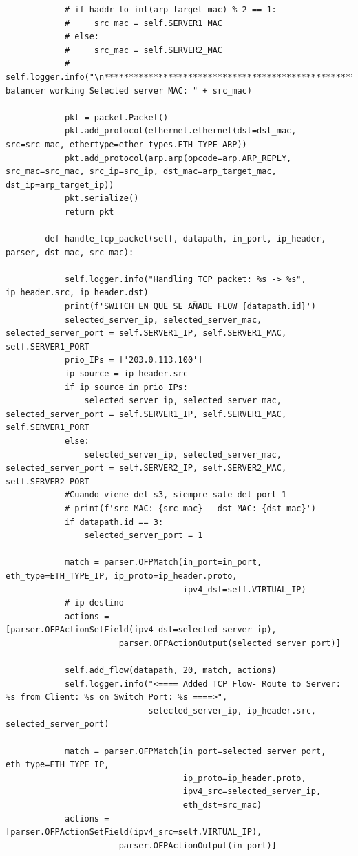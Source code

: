\documentclass[a4paper,12pt]{article}
\begin{document}
\begin{verbatim}
            # if haddr_to_int(arp_target_mac) % 2 == 1:
            #     src_mac = self.SERVER1_MAC
            # else:
            #     src_mac = self.SERVER2_MAC
            # self.logger.info("\n************************************************************\nLoad balancer working Selected server MAC: " + src_mac)
    
            pkt = packet.Packet()
            pkt.add_protocol(ethernet.ethernet(dst=dst_mac, src=src_mac, ethertype=ether_types.ETH_TYPE_ARP))
            pkt.add_protocol(arp.arp(opcode=arp.ARP_REPLY, src_mac=src_mac, src_ip=src_ip, dst_mac=arp_target_mac, dst_ip=arp_target_ip))
            pkt.serialize()
            return pkt
    
        def handle_tcp_packet(self, datapath, in_port, ip_header, parser, dst_mac, src_mac):
    
            self.logger.info("Handling TCP packet: %s -> %s", ip_header.src, ip_header.dst)
            print(f'SWITCH EN QUE SE AÑADE FLOW {datapath.id}')
            selected_server_ip, selected_server_mac, selected_server_port = self.SERVER1_IP, self.SERVER1_MAC, self.SERVER1_PORT
            prio_IPs = ['203.0.113.100']
            ip_source = ip_header.src
            if ip_source in prio_IPs:
                selected_server_ip, selected_server_mac, selected_server_port = self.SERVER1_IP, self.SERVER1_MAC, self.SERVER1_PORT
            else:
                selected_server_ip, selected_server_mac, selected_server_port = self.SERVER2_IP, self.SERVER2_MAC, self.SERVER2_PORT
            #Cuando viene del s3, siempre sale del port 1
            # print(f'src MAC: {src_mac}   dst MAC: {dst_mac}')
            if datapath.id == 3:
                selected_server_port = 1
            
            match = parser.OFPMatch(in_port=in_port, eth_type=ETH_TYPE_IP, ip_proto=ip_header.proto,
                                    ipv4_dst=self.VIRTUAL_IP)
            # ip destino
            actions = [parser.OFPActionSetField(ipv4_dst=selected_server_ip),
                       parser.OFPActionOutput(selected_server_port)]
    
            self.add_flow(datapath, 20, match, actions)
            self.logger.info("<==== Added TCP Flow- Route to Server: %s from Client: %s on Switch Port: %s ====>",
                             selected_server_ip, ip_header.src, selected_server_port)
    
            match = parser.OFPMatch(in_port=selected_server_port, eth_type=ETH_TYPE_IP,
                                    ip_proto=ip_header.proto,
                                    ipv4_src=selected_server_ip,
                                    eth_dst=src_mac)
            actions = [parser.OFPActionSetField(ipv4_src=self.VIRTUAL_IP),
                       parser.OFPActionOutput(in_port)]
    

\end{verbatim}
\end{document}
